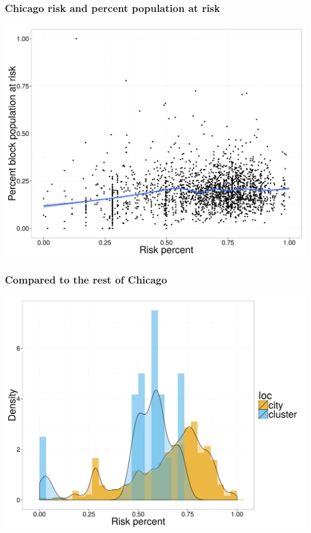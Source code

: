 \documentclass{beamer}
\begin{document}
\begin{frame}
  \frametitle{Chicago risk and percent population at risk}
  \begin{center}
    \includegraphics[width=\textwidth,height=0.8\textheight,keepaspectratio=true]{pop_fact}
  \end{center}
\end{frame}

\begin{frame}
  \frametitle{Compared to the rest of Chicago}
  \begin{center}
    \includegraphics[width=\textwidth,height=0.8\textheight,keepaspectratio=true]{big_risk}
  \end{center}
\end{frame}
\end{document}
